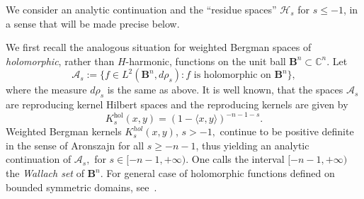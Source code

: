 \documentclass{article}
\theoremstyle{boldremark}
\renewcommand\[{\begin{equation}}
\renewcommand\]{\end{equation}}
\theoremstyle{definition}
\numberwithin{equation}{section}
\begin{document}

We consider an analytic continuation and the ``residue spaces'' \(\mathcal{H}_s\)
for \(s\leq-1\), in a sense that will be made precise below.

We first recall the analogous situation for weighted Bergman spaces of \textit{holomorphic}, rather than $H$-harmonic, functions on the unit ball $\mathbf{B}^n \subset \mathbb{C}^n$.
Let
$$
\mathcal{A}_s := \{ f \in L^2(\mathbf{B}^n, d\rho_s) : f \text{ is holomorphic on } \mathbf{B}^n \},
$$
where the measure $d\rho_s$ is the same as above. It is well known, that the spaces $\mathcal{A}_s$ are reproducing kernel Hilbert spaces and the reproducing kernels are given by 
\begin{equation}\label{Hol_Kernel}
K_s^{\mathrm{hol}}(x, y) = (1 - \langle x, y \rangle)^{-n-1-s}.
\end{equation}
Weighted Bergman kernels $K_s^{hol}(x,y)$, $s > -1,$ continue to be positive definite in the sense of Aronszajn \cite{Aro} for all $s \geq -n-1$, thus yielding an analytic continuation of $\mathcal{A}_s,$ for $s \in [-n-1, + \infty)$. One calls the interval $[-n-1, +\infty)$ the \textit{Wallach set} of $\mathbf{B}^n$. 
For general case of holomorphic functions defined on bounded symmetric domains, see~\cite{Rossi}.
\end{document}
